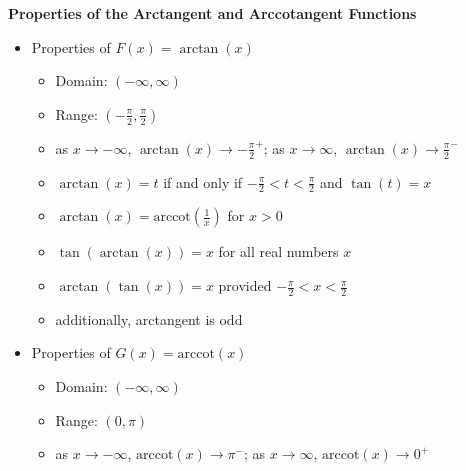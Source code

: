 \documentclass[12pt]{ximera}
\begin{document}
\begin{theorem} \label{arctangentcotangentfunctionprops}  \textbf{Properties of the Arctangent and Arccotangent Functions}     

\begin{itemize}

\item Properties of $F(x)= \arctan(x)$

\begin{itemize}

\item Domain: $(-\infty, \infty)$

\item Range: $\left(-\frac{\pi}{2}, \frac{\pi}{2}\right)$

\item  as $x \rightarrow -\infty$, $\arctan(x) \rightarrow -\frac{\pi}{2}^{+}$;  as $x \rightarrow \infty$, $\arctan(x) \rightarrow \frac{\pi}{2}^{-}$

\item  $\arctan(x) = t$ if and only if $-\frac{\pi}{2} < t < \frac{\pi}{2}$ and $\tan(t) = x$

\item  $\arctan(x) = \mbox{arccot}\left(\frac{1}{x}\right)$ for $x > 0$

\item  $\tan\left(\arctan(x)\right) = x$ for all real numbers $x$

\item  $\arctan(\tan(x)) = x$ provided $-\frac{\pi}{2} < x < \frac{\pi}{2}$

\item additionally, arctangent is odd

\end{itemize}

\item Properties of $G(x) = \mbox{arccot}(x)$

\begin{itemize}

\item Domain: $(-\infty, \infty)$

\item Range: $(0, \pi)$

\item  as $x \rightarrow -\infty$, $\mbox{arccot}(x) \rightarrow \pi^{-}$; as $x \rightarrow \infty$, $\mbox{arccot}(x) \rightarrow 0^{+}$


\end{itemize}
\end{itemize}
\end{theorem}
\end{document}
